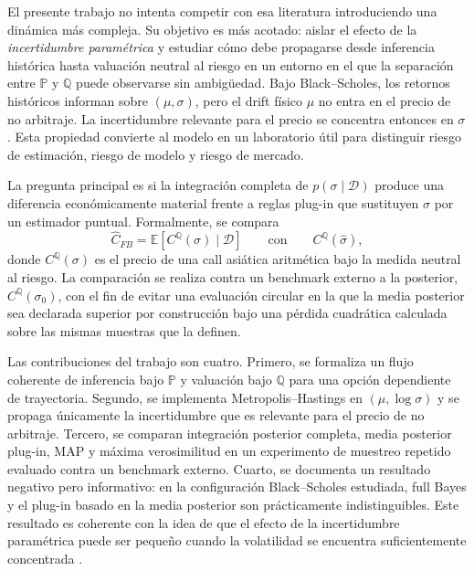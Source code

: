 \documentclass[12pt,letterpaper]{article}
\newcommand{\Pmeasure}{\mathbb{P}}
\newcommand{\Qmeasure}{\mathbb{Q}}
\newcommand{\E}{\mathbb{E}}
\begin{document}
El presente trabajo no intenta competir con esa literatura introduciendo una dinámica más compleja. Su objetivo es más acotado: aislar el efecto de la \emph{incertidumbre paramétrica} y estudiar cómo debe propagarse desde inferencia histórica hasta valuación neutral al riesgo en un entorno en el que la separación entre $\Pmeasure$ y $\Qmeasure$ puede observarse sin ambigüedad. Bajo Black--Scholes, los retornos históricos informan sobre $(\mu,\sigma)$, pero el drift físico $\mu$ no entra en el precio de no arbitraje. La incertidumbre relevante para el precio se concentra entonces en $\sigma$. Esta propiedad convierte al modelo en un laboratorio útil para distinguir riesgo de estimación, riesgo de modelo y riesgo de mercado.

La pregunta principal es si la integración completa de $p(\sigma\mid\mathcal D)$ produce una diferencia económicamente material frente a reglas plug-in que sustituyen $\sigma$ por un estimador puntual. Formalmente, se compara
\begin{equation}
 \widehat C_{FB}=\E\!\left[C^{\Qmeasure}(\sigma)\mid\mathcal D\right]
 \qquad\text{con}\qquad
 C^{\Qmeasure}(\widehat\sigma),
 \label{eq:main_question}
\end{equation}
donde $C^{\Qmeasure}(\sigma)$ es el precio de una call asiática aritmética bajo la medida neutral al riesgo. La comparación se realiza contra un benchmark externo a la posterior, $C^{\Qmeasure}(\sigma_0)$, con el fin de evitar una evaluación circular en la que la media posterior sea declarada superior por construcción bajo una pérdida cuadrática calculada sobre las mismas muestras que la definen.

Las contribuciones del trabajo son cuatro. Primero, se formaliza un flujo coherente de inferencia bajo $\Pmeasure$ y valuación bajo $\Qmeasure$ para una opción dependiente de trayectoria. Segundo, se implementa Metropolis--Hastings en $(\mu,\log\sigma)$ y se propaga únicamente la incertidumbre que es relevante para el precio de no arbitraje. Tercero, se comparan integración posterior completa, media posterior plug-in, MAP y máxima verosimilitud en un experimento de muestreo repetido evaluado contra un benchmark externo. Cuarto, se documenta un resultado negativo pero informativo: en la configuración Black--Scholes estudiada, full Bayes y el plug-in basado en la media posterior son prácticamente indistinguibles. Este resultado es coherente con la idea de que el efecto de la incertidumbre paramétrica puede ser pequeño cuando la volatilidad se encuentra suficientemente concentrada \citep{romboutsstentoft2014}.
\end{document}
